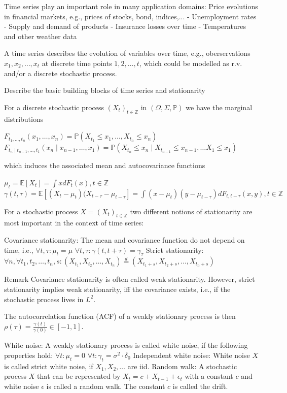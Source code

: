 Time series play an important role in many application domains:
Price evolutions in financial markets, e.g., prices of stocks, bond, indices,...
- Unemployment rates
- Supply and demand of products
- Insurance losses over time
- Temperatures and other weather data

A time series describes the evolution of variables over time, e.g., oberservations \( x_1, x_2, \dots, x_t \) at discrete
time points \( 1, 2, \dots, t \), which could be modelled as r.v. and/or a discrete stochastic process.



Describe the basic building blocks of time series and stationarity

For a discrete stochastic process \( (X_t)_{t \in \mathbb{Z}} \) in \( (\Omega, \Sigma, \mathbb{P}) \)
we have the marginal distributions

\( F_{t_1, \dots, t_n}(x_1, \dots, x_n) = \mathbb{P}(X_{t_{1}} \leq x_1, \dots, X_{t_{n}} \leq x_n) \)
\( F_{t_n \mid t_{n-1}, \dots, t_1}(x_n \mid x_{n-1}, \dots, x_1) = \mathbb{P}(X_{t_{n}} \leq x_n \mid X_{t_{n-1}} \leq x_{n-1}, \dots X_1 \leq x_{1}) \)

which induces the associated mean and autocovariance functions

\( \mu_t = \mathbb{E}[X_t] = \int xdF_t(x), t \in \mathbb{Z} \)
\( \gamma(t, \tau) = \mathbb{E}[(X_t - \mu_t)(X_{t-\tau} - \mu_{t-\tau}] = \int (x - \mu_t)(y - \mu_{t-\tau})dF_{t,t-\tau}(x,y), t \in \mathbb{Z} \)

For a stochastic process \(X = (X_t)_{t \in \mathbb{Z}}\) two different notions of stationarity are most important in the context of time series:

Covariance stationarity: The mean and covariance function do not depend on time, i.e.,
    \(\forall t, \tau: \mu_t = \mu\)
    \(\forall t, \tau: \gamma(t, t + \tau) = \gamma_\tau\)
Strict stationarity: \(\forall n, \forall t_1, t_2, \dots, t_n, s: (X_{t_1}, X_{t_2}, \dots, X_{t_n}) \stackrel{d}{=} (X_{t_1 + s}, X_{t_2 + s}, \dots, X_{t_n + s})\)

Remark
Covariance stationarity is often called weak stationarity.
However, strict stationarity implies weak stationarity, iff the covariance exists, i.e., if the stochastic process lives in \(L^2\).

The autocorrelation function (ACF) of a weakly stationary process is then \( \rho(\tau) = \frac{\gamma(t)}{\gamma(0)} \in [−1, 1]\).

White noise: A weakly stationary process is called white noise, if the following properties hold:
\(\forall t: \mu_t = 0\)
\(\forall t: \gamma_t = \sigma^2 \cdot \delta_0\)
Independent white noise: White noise \(X\) is called strict white noise, if \(X_1, X_2, \dots\) are iid.
Random walk: A stochastic process \(X\) that can be represented by 
\(X_t = c + X_{t - 1} + \epsilon_t\) with a constant \(c\) and white noise \(\epsilon\) is called a random walk. The constant \(c\) is called the drift.

